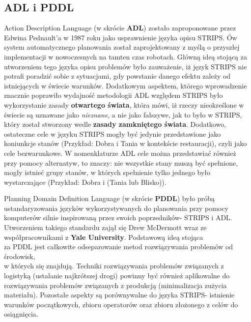     \subsection{ADL i PDDL}
    Action Description Language (w skrócie \textbf{ADL}) zostało zaproponowane przez Edwina Pednault'a  w 1987 roku jako usprawnienie 
    języka opisu STRIPS. Ów system automatycznego planowania został zaprojektowany z myślą o przyszłej implementacji w nowoczesnych na tamten czas robotach.
    Główną ideą stojącą za utworzeniem tego języka opisu problemów było zauważenie, iż język STRIPS nie potrafi poradzić sobie z sytuacjami, gdy
    powstanie danego efektu zależy od istniejących w świecie warunków. Dodatkowym aspektem, którego wprowadzenie znacznie poprawiło wydajność metodologii ADL względem STRIPS 
    było wykorzystanie zasady \textbf{otwartego świata}, która mówi, iż rzeczy nieokreślone w świecie są uznawane jako \textit{nieznane}, a nie jako 
    fałszywe, jak to było w STRIPS, który został stworzony wedle \textbf{zasady zamkniętego świata}. Dodatkowo, ostateczne cele w języku STRIPS mogły być jedynie przedstawione jako 
    koniunkcje stanów (Przykład: Dobra i Tania w kontekście restauracji), czyli jako cele bezwarunkowe. 
    W nomenklaturze ADL cele można przedstawiać również przy pomocy alternatyw, to znaczy: 
    nie wszystkie stany muszą być spełnione, mogły istnieć grupy stanów, w których spełnienie tylko jednego było wystarczające (Przykład: Dobra i (Tania lub Blisko)). 

    Planning Domain Definition Language (w skrócie \textbf{PDDL}) było próbą ustandaryzowania języków wykorzystywanych 
    do planowania przy pomocy komputerów silnie inspirowaną przez swoich poprzedników- STRIPS i ADL. 
    Utworzeniem takiego standardu zajął się Drew McDermott wraz ze współpracownikami z \textbf{Yale University}.
    Podstawową ideą stojąca \\
    za PDDL jest całkowite odseparowanie metod rozwiązywania problemów od środowisk, \\
    w których się 
    znajdują. Techniki rozwiązywania problemów związanych z logistyką (ustalanie najkrótszej drogi) powinny być również aplikowalne do rozwiązywania problemów 
    związanych z produkcją (minimalizacja zużycia materiału). Pozostałe aspekty są porównywalne do języka STRIPS- 
    istnienie warunków początkowych, zbioru operatorów oraz zbioru złożonego z celów do osiągnięcia.



